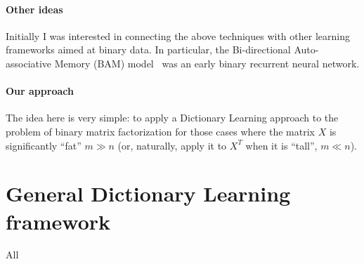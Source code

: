 \documentclass[a4paper,11pt]{report}
\begin{document}
\paragraph{Other ideas} Initially I was interested in connecting the above techniques with other learning frameworks aimed at binary data. In particular, the Bi-directional Auto-associative Memory (BAM) model~\cite{bam} was an early binary recurrent neural network.


\paragraph{Our approach} The idea here is very simple: to apply a Dictionary Learning approach to the problem of binary matrix factorization for those cases where the matrix $X$ is significantly ``fat'' $m \gg n$ (or, naturally, apply it to $X^T$ when it is ``tall'', $m \ll n$). 

\section{General Dictionary Learning framework}

All 


\cite{ksvd}



\end{document}
